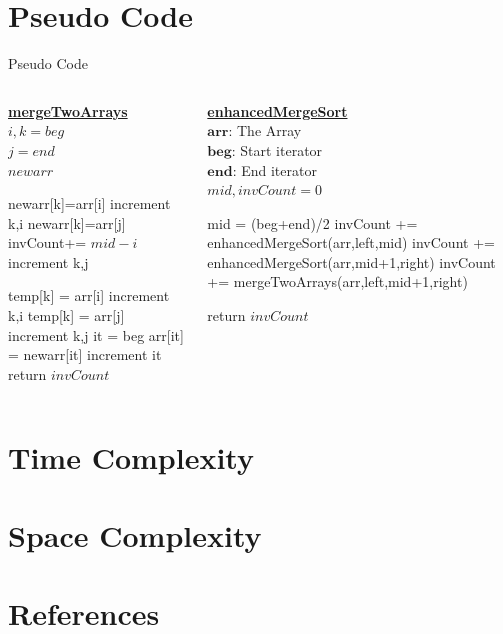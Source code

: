 \documentclass{beamer}
\begin{document}
\section{\textbf{Pseudo Code}}
\begin{frame}{Pseudo Code}
\fontsize{8pt}{8}\selectfont
\begin{columns}

\begin{column}{0.5\textwidth}
\textbf{\underline{mergeTwoArrays}}\\
\vspace{3pt}
$i,k=beg$\\
  $j=end$\\
  $newarr$
\begin{algorithmic}
        \STATE newarr[k]=arr[i]
        \STATE increment k,i
    \ELSE
        \STATE newarr[k]=arr[j]
        \STATE invCount+= $mid-i$
        \STATE increment k,j
    \ENDIF
    \ENDWHILE
    
    \STATE temp[k] = arr[i]
    \STATE increment k,i
  \ENDWHILE
    \STATE temp[k] = arr[j]
    \STATE increment k,j
  \ENDWHILE
  it = beg
    \STATE arr[it] = newarr[it]
    \STATE increment it
  \ENDWHILE
  \\return $invCount$
\end{algorithmic}
\end{column}

\begin{column}{0.5\textwidth}
\textbf{\underline{enhancedMergeSort}}\\
\vspace{3pt}
$\bm{arr}$: The Array\\
$\bm{beg}$: Start iterator\\
$\bm{end}$: End iterator\\
 $mid, invCount=0$
\begin{algorithmic}

        \STATE mid = (beg+end)/2
        \STATE invCount += enhancedMergeSort(arr,left,mid)
        \STATE invCount += enhancedMergeSort(arr,mid+1,right)
        \STATE invCount += mergeTwoArrays(arr,left,mid+1,right)
    \ENDIF
    
    return $invCount$
\end{algorithmic}
\end{column}
\end{columns}
\end{frame}

\section{Time Complexity}

\section{Space Complexity}


\section{References}
\end{document}
